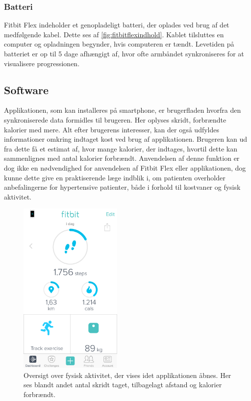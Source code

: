 \subsubsection{Batteri} 
Fitbit Flex indeholder et genopladeligt batteri, der oplades ved brug af det medfølgende kabel. Dette ses af \autoref{fig:fitbitflexindhold}. Kablet tilsluttes en computer og opladningen begynder, hvis computeren er tændt. 
Levetiden på batteriet er op til 5 dage afhængigt af, hvor ofte armbåndet synkroniseres for at visualisere progressionen.


\subsection{Software}
Applikationen, som kan installeres på smartphone, er brugerfladen hvorfra den synkroniserede data formidles til brugeren. Her oplyses skridt, forbrændte kalorier med mere. 
Alt efter brugerens interesser, kan der også udfyldes informationer omkring indtaget kost ved brug af applikationen. Brugeren kan ud fra dette få et estimat af, hvor mange kalorier, der indtages, hvortil dette kan sammenlignes med antal kalorier forbrændt. Anvendelsen af denne funktion er dog ikke en nødvendighed for anvendelsen af Fitbit Flex eller applikationen, dog kunne dette give en praktiserende læge indblik i, om patienten overholder anbefalingerne for hypertensive patienter, både i forhold til kostvaner og fysisk aktivitet. 

\begin{figure}[H]
	\centering
	\includegraphics[width=0.45\textwidth]{figures/burgerfladeoversigt}
	\caption{Oversigt over fysisk aktivitet, der vises idet applikationen åbnes. Her ses blandt andet antal skridt taget, tilbagelagt afstand og kalorier forbrændt.}
	\label{fig:brugerfladeoversigt}
\end{figure}


